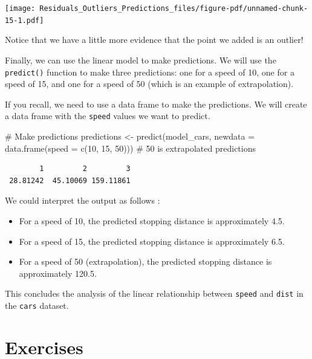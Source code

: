 \documentclass[
  letterpaper,
  DIV=11,
  numbers=noendperiod]{scrreprt}
\newenvironment{Shaded}{\begin{snugshade}}{\end{snugshade}}
\newcommand{\AttributeTok}[1]{\textcolor[rgb]{0.40,0.45,0.13}{#1}}
\newcommand{\CommentTok}[1]{\textcolor[rgb]{0.37,0.37,0.37}{#1}}
\newcommand{\DecValTok}[1]{\textcolor[rgb]{0.68,0.00,0.00}{#1}}
\newcommand{\FunctionTok}[1]{\textcolor[rgb]{0.28,0.35,0.67}{#1}}
\newcommand{\NormalTok}[1]{\textcolor[rgb]{0.00,0.23,0.31}{#1}}
\newcommand{\OtherTok}[1]{\textcolor[rgb]{0.00,0.23,0.31}{#1}}
\providecommand{\tightlist}{%
  \setlength{\itemsep}{0pt}\setlength{\parskip}{0pt}}\usepackage{longtable,booktabs,array}
\begin{document}
\texttt{[image: Residuals\_Outliers\_Predictions\_files/figure-pdf/unnamed-chunk-15-1.pdf]}

Notice that we have a little more evidence that the point we added is an
outlier!

Finally, we can use the linear model to make predictions. We will use
the \texttt{predict()} function to make three predictions: one for a
speed of 10, one for a speed of 15, and one for a speed of 50 (which is
an example of extrapolation).

If you recall, we need to use a data frame to make the predictions. We
will create a data frame with the \texttt{speed} values we want to
predict.

\begin{Shaded}
\begin{Highlighting}[]
\CommentTok{\# Make predictions}
\NormalTok{predictions }\OtherTok{\textless{}{-}} \FunctionTok{predict}\NormalTok{(model\_cars, }\AttributeTok{newdata =} \FunctionTok{data.frame}\NormalTok{(}\AttributeTok{speed =} \FunctionTok{c}\NormalTok{(}\DecValTok{10}\NormalTok{, }\DecValTok{15}\NormalTok{, }\DecValTok{50}\NormalTok{))) }\CommentTok{\# 50 is extrapolated}
\NormalTok{predictions}
\end{Highlighting}
\end{Shaded}

\begin{verbatim}
        1         2         3 
 28.81242  45.10069 159.11861 
\end{verbatim}

We could interpret the output as follows :

\begin{itemize}
\tightlist
\item
  For a speed of 10, the predicted stopping distance is approximately
  4.5.
\item
  For a speed of 15, the predicted stopping distance is approximately
  6.5.
\item
  For a speed of 50 (extrapolation), the predicted stopping distance is
  approximately 120.5.
\end{itemize}

This concludes the analysis of the linear relationship between
\texttt{speed} and \texttt{dist} in the \texttt{cars} dataset.

\section*{Exercises}\label{exercises-15}
\end{document}
